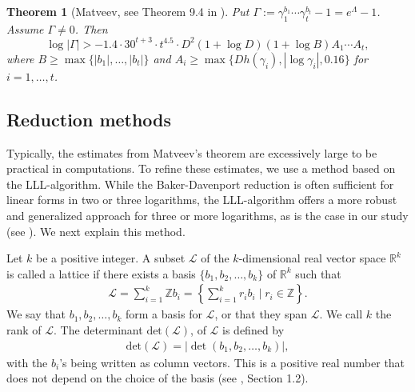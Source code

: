 \documentclass[11pt,a4paper]{article}
\newtheorem{theorem}{Theorem}[section]
\numberwithin{equation}{section}
\numberwithin{table}{section}
\numberwithin{figure}{section}
\begin{document}
\begin{theorem}[Matveev, see Theorem 9.4 in \cite{matl}]
	\label{thm:Matl} 
	Put $\Gamma:=\gamma_1^{b_1}\cdots \gamma_t^{b_t}-1=e^{\Lambda}-1$. Assume $\Gamma\ne 0$. Then 
	$$
	\log |\Gamma|>-1.4\cdot 30^{t+3}\cdot t^{4.5} \cdot D^2 (1+\log D)(1+\log B)A_1\cdots A_t,
	$$
	where $B\ge \max\{|b_1|,\ldots,|b_t|\}$ and $A_i\ge \max\{Dh(\gamma_i),|\log \gamma_i|,0.16\}$ for $i=1,\ldots,t$.
\end{theorem}

\subsection{Reduction methods}
Typically, the estimates from Matveev's theorem are excessively large to be practical in computations. To refine these estimates, we use a method based on the LLL-algorithm. While the Baker-Davenport reduction is often sufficient for linear forms in two or three logarithms, the LLL-algorithm offers a more robust and generalized approach for three or more logarithms, as is the case in our study (see \cite{SMA, Weg}). We next explain this method.

Let $k$ be a positive integer. A subset $\mathcal{L}$ of the $k$-dimensional real vector space ${ \mathbb{R}^k}$ is called a lattice if there exists a basis $\{b_1, b_2, \ldots, b_k \}$ of $\mathbb{R}^k$ such that
\begin{align*}
	\mathcal{L} = \sum_{i=1}^{k} \mathbb{Z} b_i = \left\{ \sum_{i=1}^{k} r_i b_i \mid r_i \in \mathbb{Z} \right\}.
\end{align*}
We say that $b_1, b_2, \ldots, b_k$ form a basis for $\mathcal{L}$, or that they span $\mathcal{L}$. We
call $k$ the rank of $ \mathcal{L}$. The determinant $\text{det}(\mathcal{L})$, of $\mathcal{L}$ is defined by
\begin{align*}
	\text{det}(\mathcal{L}) = | \det(b_1, b_2, \ldots, b_k) |,
\end{align*}
with the $b_i$'s being written as column vectors. This is a positive real number that does not depend on the choice of the basis (see \cite{Cas}, Section 1.2).
\end{document}
